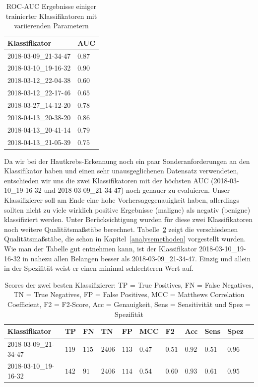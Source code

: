 \begin{table}[htb!]
\begin{center}
\begin{tabular}{ll}
	\toprule
 	Klassifikator  & AUC\\
	\midrule
  	2018-03-09\_21-34-47 &   $0.87$\\
    2018-03-10\_19-16-32 &   $0.90$\\
    2018-03-12\_22-04-38 &   $0.60$\\
    2018-03-12\_22-17-46 &   $0.65$\\
    2018-03-27\_14-12-20 &   $0.78$\\
    2018-04-13\_20-38-20 &   $0.86$\\
    2018-04-13\_20-41-14 &   $0.79$\\
    2018-04-13\_21-05-39 &   $0.75$\\
 \bottomrule
 \end{tabular}
 \end{center}
  \caption{ROC-AUC Ergebnisse einiger trainierter Klassifikatoren mit variierenden Parametern}
 \label{tab:auc}
 \end{table}
 
Da wir bei der Hautkrebs-Erkennung noch ein paar Sonderanforderungen an den Klassifikator haben und einen sehr unausgeglichenen Datensatz verwendeten, entschieden wir uns die zwei Klassifikatoren mit der höchsten AUC (2018-03-10\_19-16-32 und 2018-03-09\_21-34-47) noch genauer zu evaluieren. Unser Klassifizierer soll am Ende  eine hohe Vorhersagegenauigkeit haben, allerdings sollten nicht zu viele wirklich positive Ergebnisse (maligne) als negativ (benigne) klassifiziert werden. Unter Berücksichtigung wurden für diese zwei Klassifikatoren noch weitere Qualitätsmaßstäbe berechnet. Tabelle~\ref{tab:scores} zeigt die verschiedenen Qualitätsmaßstäbe, die schon in Kapitel~\ref{analysemethoden} vorgestellt wurden. Wie man der Tabelle gut entnehmen kann, ist der Klassifikator 2018-03-10\_19-16-32 in nahezu allen Belangen besser als 2018-03-09\_21-34-47. Einzig und allein in der Spezifität weist er einen minimal schlechteren Wert auf.

\begin{table}[htb!]
\begin{center}
\begin{tabular}{lllllllllll}
	\toprule
 	Klassifikator  & TP & FN & TN & FP & MCC & F2 & Acc & Sens & Spez\\
	\midrule
	2018-03-09\_21-34-47 & $119$ &	$115$ &	$2406$ &	$113$ &	$0.47$ &	$0.51$&	$0.92$ &	$0.51$ & $0.96$\\
    2018-03-10\_19-16-32 & $142$&	$91$ &	$2406$ &	$114$ &	$0.54$ 	&$0.60$	&$0.93$	&$0.61$&	$0.95$ \\
 \bottomrule
 \end{tabular}
 \end{center}
  \caption{Scores der zwei besten Klassifizierer: TP = True Positives, FN = False Negatives, TN = True Negatives, FP = False Positives, MCC = Matthews Correlation Coefficient, F2 = F2-Score, Acc = Genauigkeit, Sens = Sensitivität und Spez = Spezifität }
 \label{tab:scores}
 \end{table}
 
